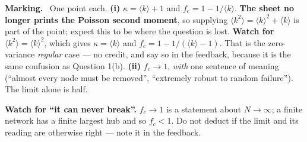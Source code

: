 \documentclass[a4paper, 11pt]{extarticle}
\newenvironment{grading}
  {\begin{tcolorbox}[colback=pltblue!4, colframe=pltblue!35, boxrule=0.5pt,
                     sharp corners, boxsep=2pt, left=6pt, right=6pt,
                     top=4pt, bottom=4pt]\footnotesize\textbf{Marking.}\ }
  {\end{tcolorbox}}
\begin{document}
\begin{grading}
One point each.
\textbf{(i)} $\kappa = \langle k \rangle + 1$ and
$f_c = 1 - 1/\langle k \rangle$. \textbf{The sheet no longer prints the
Poisson second moment}, so supplying $\langle k^2 \rangle = \langle k \rangle^2
+ \langle k \rangle$ is part of the point; expect this to be where the question
is lost.
\textbf{Watch for $\langle k^2 \rangle = \langle k \rangle^2$}, which gives
$\kappa = \langle k \rangle$ and $f_c = 1 - 1/(\langle k \rangle - 1)$. That is
the zero-variance \emph{regular} case --- no credit, and say so in the
feedback, because it is the same confusion as Question 1(b).
\textbf{(ii)} $f_c \to 1$, \emph{with} one sentence of meaning (``almost every
node must be removed'', ``extremely robust to random failure''). The limit
alone is half.

\textbf{Watch for ``it can never break''.} $f_c \to 1$ is a statement about
$N \to \infty$; a finite network has a finite largest hub and so $f_c < 1$. Do
not deduct if the limit and its reading are otherwise right --- note it in the
feedback.
\end{grading}
\end{document}
